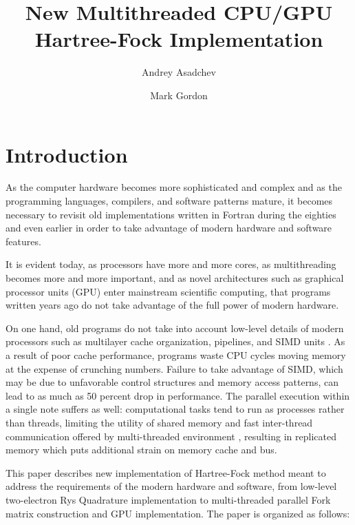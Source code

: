 \documentclass[12pt]{article}
\title{New Multithreaded CPU/GPU Hartree-Fock Implementation}
\author{Andrey Asadchev \and Mark Gordon}
\date{}
\begin{document}
\maketitle 


\section*{Introduction}
As the computer hardware becomes more sophisticated and complex and as the
programming languages, compilers, and software patterns mature, it becomes
necessary to revisit old implementations written in Fortran during the eighties
and even earlier in order to take advantage of modern hardware and software features.

It is evident today, as processors have more and more cores, as multithreading
becomes more and more important, and as novel architectures such as graphical
processor units (GPU) enter mainstream scientific computing, that programs
written years ago do not take advantage of the full power of modern hardware.

On one hand, old programs do not take into account low-level details of modern
processors such as multilayer cache organization, pipelines, and SIMD
units \cite{gerber_software_2006}.
As a result of poor cache performance, programs waste CPU cycles moving memory at
the expense of crunching numbers.  Failure to take advantage of SIMD, which may
be due to unfavorable control structures and memory access patterns, can lead to
as much as 50 percent drop in performance.  The parallel execution within a
single note suffers as well: computational tasks tend to run as processes rather
than threads, limiting the utility of shared memory and fast inter-thread
communication offered by multi-threaded environment
\cite{gerber_programming_2004},
resulting in replicated memory which puts additional strain on memory cache and bus.

This paper describes new implementation of Hartree-Fock method meant
to address the requirements of the modern hardware and software, from low-level
two-electron Rys Quadrature implementation to multi-threaded parallel Fork matrix
construction and GPU implementation.  The paper is organized as follows:
\end{document}
